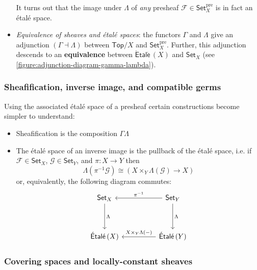 \documentclass[10pt]{article}
\newcommand{\Set}{\mathsf{Set}}
\newcommand{\Top}{\mathsf{Top}}
\newcommand{\Etale}{\mathsf{\acute{E}tal\acute{e}}\,}
\newcommand{\fsheaf}{\mathcal{F}}
\newcommand{\gsheaf}{\mathcal{G}}
\newcommand{\pre}{\text{pre}}
\begin{document}
\begin{itemize}
                        It turns out that the image under $\Lambda$ of \textit{any} presheaf $\fsheaf\in\Set_X^\pre$ is in fact an étalé space.
                    \item \textit{Equivalence of sheaves and étalé spaces}: the functors $\Gamma$ and $\Lambda$ give an adjunction $(\Gamma\dashv\Lambda)$ between $\Top/X$ and $\Set_X^\pre$.
                        Further, this adjunction descends to an \textbf{equivalence} between $\Etale(X)$ and $\Set_X$ (see \cref{figure:adjunction-diagram-gamma-lambda}).
                \end{itemize}
              

            \subsubsection{Sheafification, inverse image, and compatible germs}
            
                Using the associated étalé space of a presheaf certain constructions become simpler to understand:
                \begin{itemize}
                    \item Sheafification is the composition $\Gamma\Lambda$
                    \item The étalé space of an inverse image is the pullback of the étalé space, i.e. if $\fsheaf\in\Set_X$, $\gsheaf\in\Set_Y$, and $\pi\colon X\to Y$ then \[\Lambda(\pi^{-1}\gsheaf)\cong (X\times_Y\Lambda(\gsheaf)\to X)\] or, equivalently, the following diagram commutes:
                        \begin{equation*}
                            \begin{tikzcd}[row sep=huge, column sep=huge]
                                \Set_X
                                    \ar{d}{\Lambda}
                                &\Set_Y
                                    \ar{l}[swap]{\pi^{-1}}
                                    \ar{d}{\Lambda}\\
                                \Etale(X)
                                &\Etale(Y)
                                    \ar{l}[swap]{X\times_Y\Lambda(-)}
                            \end{tikzcd}
                        \end{equation*} 
                \end{itemize}
                
            \subsubsection{Covering spaces and locally-constant sheaves}\label{subsubsection:covering-spaces-locally-constant-sheaves}
            
\end{document}
